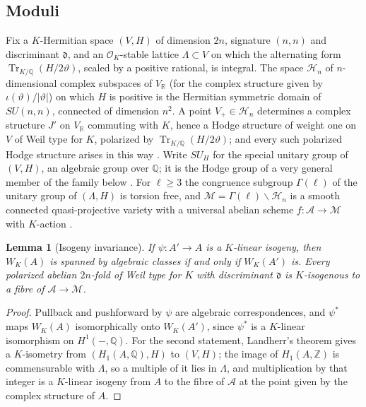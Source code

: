 \documentclass[11pt]{amsart}
\newtheorem{lemma}[theorem]{Lemma}
\theoremstyle{definition}
\theoremstyle{remark}
\newcommand{\Q}{\mathbb Q}
\newcommand{\Z}{\mathbb Z}
\newcommand{\R}{\mathbb R}
\newcommand{\Tr}{\operatorname{Tr}}
\newcommand{\cHn}{\mathcal H_n}
\newcommand{\cM}{\mathcal M}
\newcommand{\fd}{\mathfrak d}
\begin{document}
\subsection{Moduli}\label{subsec:moduli}
Fix a $K$-Hermitian space $(V,H)$ of dimension $2n$, signature $(n,n)$ and discriminant $\fd$, and an $\mathcal O_K$-stable lattice $\Lambda\subset V$ on which the alternating form $\Tr_{K/\Q}(H/2\vartheta)$, scaled by a positive rational, is integral. The space $\cHn$ of $n$-dimensional complex subspaces of $V_\R$ (for the complex structure given by $\iota(\vartheta)/|\vartheta|$) on which $H$ is positive is the Hermitian symmetric domain of $SU(n,n)$, connected of dimension $n^2$. A point $V_+\in\cHn$ determines a complex structure $J'$ on $V_\R$ commuting with $K$, hence a Hodge structure of weight one on $V$ of Weil type for $K$, polarized by $\Tr_{K/\Q}(H/2\vartheta)$; and every such polarized Hodge structure arises in this way \cite[5.10 and the proof of 6.11]{vanGeemen}. Write $SU_H$ for the special unitary group of $(V,H)$, an algebraic group over $\Q$; it is the Hodge group of a very general member of the family below \cite[Theorem~6.11]{vanGeemen}. For $\ell\ge3$ the congruence subgroup $\Gamma(\ell)$ of the unitary group of $(\Lambda,H)$ is torsion free, and $\cM=\Gamma(\ell)\backslash\cHn$ is a smooth connected quasi-projective variety with a universal abelian scheme $f\colon\mathcal A\to\cM$ with $K$-action \cite[\S\S5.5--5.11]{vanGeemen}.

\begin{lemma}[Isogeny invariance]\label{lem:isogeny}
If $\psi\colon A'\to A$ is a $K$-linear isogeny, then $W_K(A)$ is spanned by algebraic classes if and only if $W_K(A')$ is. Every polarized abelian $2n$-fold of Weil type for $K$ with discriminant $\fd$ is $K$-isogenous to a fibre of $\mathcal A\to\cM$.
\end{lemma}

\begin{proof}
Pullback and pushforward by $\psi$ are algebraic correspondences, and $\psi^*$ maps $W_K(A)$ isomorphically onto $W_K(A')$, since $\psi^*$ is a $K$-linear isomorphism on $H^1(-,\Q)$. For the second statement, Landherr's theorem gives a $K$-isometry from $(H_1(A,\Q),H)$ to $(V,H)$; the image of $H_1(A,\Z)$ is commensurable with $\Lambda$, so a multiple of it lies in $\Lambda$, and multiplication by that integer is a $K$-linear isogeny from $A$ to the fibre of $\mathcal A$ at the point given by the complex structure of $A$.
\end{proof}
\end{document}
